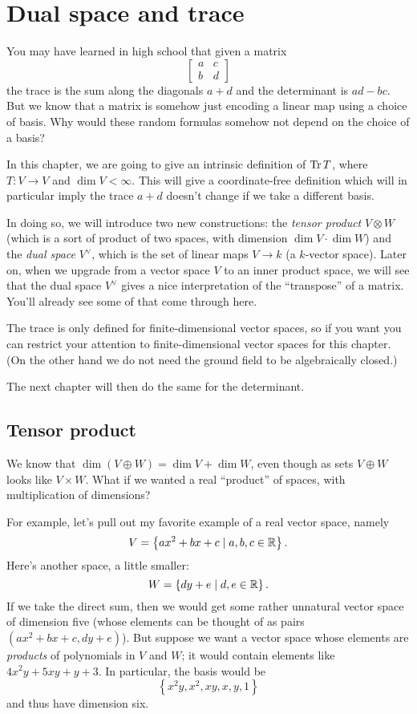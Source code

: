 \chapter{Dual space and trace}
\label{ch:dual_space_trace}
You may have learned in high school that given a matrix
\[
	\begin{bmatrix}
		a & c \\
		b & d
	\end{bmatrix}
\]
the trace is the sum along the diagonals $a+d$
and the determinant is $ad-bc$.
But we know that a matrix is somehow
just encoding a linear map using a choice of basis.
Why would these random formulas somehow not
depend on the choice of a basis?

In this chapter, we are going to
give an intrinsic definition of $\operatorname{Tr} T$,
where $T \colon V \to V$ and $\dim V < \infty$.
This will give a coordinate-free definition
which will in particular imply the trace $a+d$
doesn't change if we take a different basis.

In doing so, we will introduce two new constructions:
the \emph{tensor product} $V \otimes W$
(which is a sort of product of two spaces,
with dimension $\dim V \cdot \dim W$)
and the \emph{dual space} $V^\vee$,
which is the set of linear maps $V \to k$ (a $k$-vector space).
Later on, when we upgrade from a vector space $V$
to an inner product space,
we will see that the dual space $V^\vee$ gives a nice
interpretation of the ``transpose'' of a matrix.
You'll already see some of that come through here.

The trace is only defined for finite-dimensional
vector spaces, so if you want you can restrict
your attention to finite-dimensional vector spaces for this chapter.
(On the other hand we do not need the
ground field to be algebraically closed.)

The next chapter will then do the same for the determinant.

\section{Tensor product}
We know that $\dim (V \oplus W) = \dim V + \dim W$,
even though as sets $V \oplus W$ looks like $V \times W$.
What if we wanted a real ``product'' of spaces,
with multiplication of dimensions?

For example, let's pull out
my favorite example of a real vector space, namely
\[ V = \left\{ ax^2 + bx + c \mid a,b,c \in \mathbb R \right\}. \]
Here's another space, a little smaller:
\[ W = \left\{ dy + e \mid d,e \in \mathbb R \right\}. \]
If we take the direct sum, then we would get some rather unnatural
vector space of dimension five
(whose elements can be thought of as pairs $(ax^2+bx+c,dy+e)$).
But suppose we want a vector space
whose elements are \emph{products} of polynomials in $V$ and $W$;
it would contain elements like $4x^2y + 5xy + y + 3$.
In particular, the basis would be
\[ \left\{ x^2y, x^2, xy, x, y, 1 \right\} \]
and thus have dimension six.

